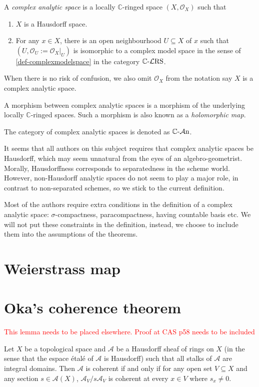 \begin{definition}\label{def-complexanalyticspace}
    A \emph{complex analytic space} is a locally $\mathbb{C}$-ringed space $(X,\mathcal{O}_X)$ such that 
    \begin{enumerate}
        \item $X$ is a Hausdorff space.
        \item For any $x\in X$, there is an open neighbourhood $U\subseteq X$ of $x$ such that $(U,\mathcal{O}_U:=\mathcal{O}_X|_U)$ is isomorphic to a complex model space in the sense of \cref{def-complexmodelspace} in the category $\mathbb{C}\text{-}\mathcal{L}\mathrm{RS}$.
    \end{enumerate}
    When there is no risk of confusion, we also omit $\mathcal{O}_X$ from the notation say $X$ is a complex analytic space.

    A morphism between complex analytic spaces is a morphism of the underlying locally $\mathbb{C}$-ringed spaces. Such a morphism is also known as a \emph{holomorphic map}.

    The category of complex analytic spaces is denoted as $\mathbb{C}\text{-}\mathcal{A}\mathrm{n}$.
\end{definition}
\begin{remark}
    It seems that all authors on this subject requires that complex analytic spaces be Hausdorff, which may seem unnatural from the eyes of an algebro-geometrist. Morally, Hausdorffness corresponds to separatedness in the scheme world. However, non-Hausdorff analytic spaces do not seem to play a major role, in contrast to non-separated schemes, so we stick to the current definition.
\end{remark}
\begin{remark}
    Most of the authors require extra conditions in the definition of a complex analytic space: $\sigma$-compactness, paracompactness, having countable basis etc. We will not put these constraints in the definition, instead, we choose to include them into the assumptions of the theorems.
\end{remark}


\section{Weierstrass map}

\section{Oka's coherence theorem}

\textcolor{red}{This lemma needs to be placed elsewhere. Proof at CAS p58 needs to be included}
\begin{lemma}\label{lma-formalcoherencecriterion}
    Let $X$ be a topological space and $\mathcal{A}$ be a Hausdorff sheaf of rings on $X$ (in the sense that the espace étalé of $\mathcal{A}$ is Hausdorff) such that all stalks of $\mathcal{A}$ are integral domains. Then $\mathcal{A}$ is coherent if and only if for any open set $V\subseteq X$ and any section $s\in \mathcal{A}(X)$, $\mathcal{A}_V/s\mathcal{A}_V$ is coherent at every $x\in V$ where $s_x\neq 0$.
\end{lemma}

